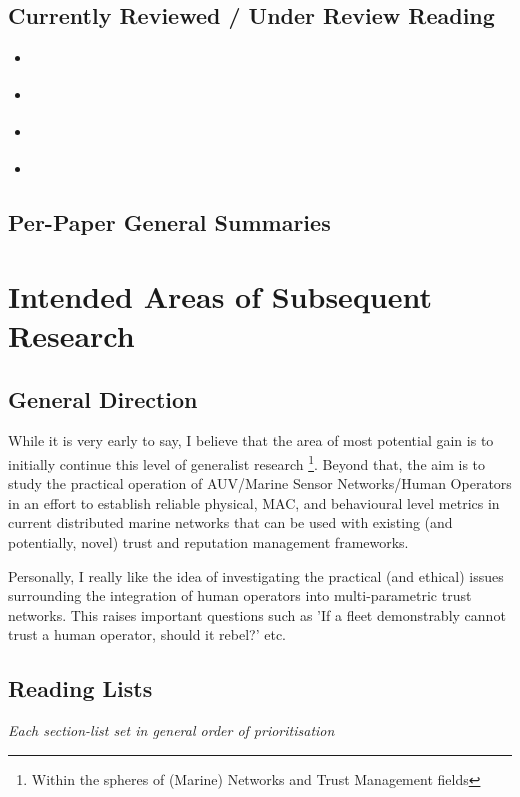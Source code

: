 \documentclass[twoside,9pt,a4paper]{Latex/Classes/PhDthesisPSnPDF}
\begin{document}
\section{Currently Reviewed / Under Review Reading}
\begin{itemize}
  \item \citet*{Partan2006}
  \item \citet*{Fall2003}
  \item \citet*{Guo}
  \item \citet*{Liu2006}
\end{itemize}
\section{Per-Paper General Summaries}



\chapter{Intended Areas of Subsequent Research}
\section{General Direction}
While it is very early to say, I believe that the area of most potential gain is
to initially continue this level of generalist research \footnote{Within the
spheres of (Marine) Networks and Trust Management fields}.  Beyond that, the aim
is to study the practical operation of AUV/Marine Sensor Networks/Human
Operators in an effort to establish reliable physical, MAC, and behavioural level metrics in current
distributed marine networks that can be used with existing (and potentially, novel) trust
and reputation management frameworks.

Personally, I really like the idea of investigating the practical (and ethical)
issues surrounding the integration of human operators into multi-parametric
trust networks. This raises important questions such as 'If a fleet demonstrably
cannot trust a human operator, should it rebel?' etc. 

\section{Reading Lists}
\emph{Each section-list set in general order of prioritisation}
\end{document}
